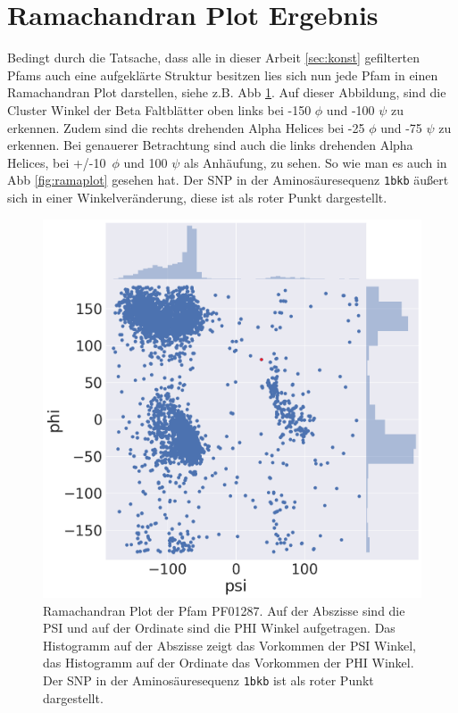 \section{Ramachandran Plot Ergebnis}
Bedingt durch die Tatsache, dass alle in dieser Arbeit \ref{sec:konst} gefilterten \ac{Pfams} auch eine aufgeklärte Struktur besitzen lies sich nun jede \ac{Pfam} in einen Ramachandran Plot darstellen, siehe z.B. \ac{Abb} \ref{fig:ramachandran_PF01287}. Auf dieser Abbildung, sind die Cluster Winkel der Beta Faltblätter oben links bei -150 $\phi$ und -100 $\psi$ zu erkennen. Zudem sind die rechts drehenden Alpha Helices bei -25 $\phi$ und -75 $\psi$ zu erkennen. Bei genauerer Betrachtung sind auch die links drehenden Alpha Helices, bei +/-10\ $\phi$ und 100 $\psi$ als Anhäufung, zu sehen. So wie man es auch in \ac{Abb} \ref{fig:ramaplot} gesehen hat. Der \ac{SNP} in der Aminosäuresequenz \texttt{1bkb} äußert sich in einer Winkelveränderung, diese ist als roter Punkt dargestellt.

\begin{figure}
    \centering
    \includegraphics[width=.90\textwidth]{images/ramachandranplot_PF01287.png}
    \caption{Ramachandran Plot der Pfam PF01287. Auf der Abszisse sind die PSI und auf der Ordinate sind die PHI Winkel aufgetragen. Das Histogramm auf der Abszisse zeigt das Vorkommen der PSI Winkel, das Histogramm auf der Ordinate das Vorkommen der PHI Winkel. Der \ac{SNP} in der Aminosäuresequenz \texttt{1bkb} ist als roter Punkt dargestellt.}
    \label{fig:ramachandran_PF01287}
\end{figure}


